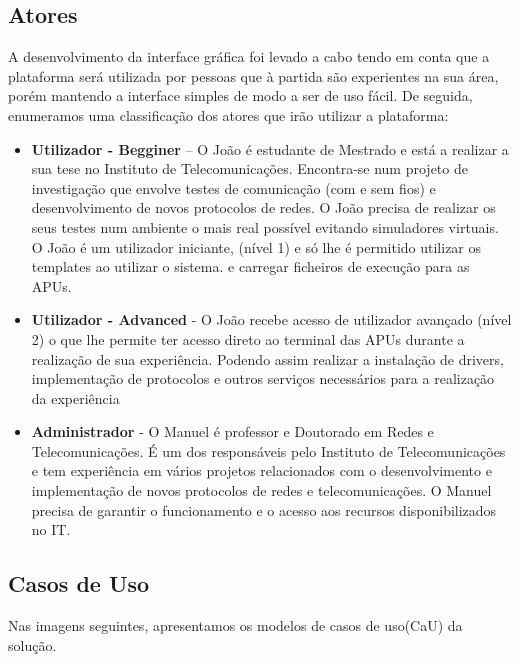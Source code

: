\subsection{Atores}
A desenvolvimento da interface gráfica foi levado a cabo tendo em conta que a plataforma será utilizada por pessoas que à partida são experientes na sua área, porém mantendo a interface simples de modo a ser de uso fácil. De seguida, enumeramos uma classificação dos atores que irão utilizar a plataforma:
\begin{itemize}[noitemsep]
    \item \textbf{Utilizador - Begginer}  – O João é estudante de Mestrado e está a realizar a sua tese no Instituto de Telecomunicações. Encontra-se num projeto de investigação que envolve testes de comunicação (com e sem fios) e desenvolvimento de novos protocolos de redes.\newline 
    O João precisa de realizar os seus testes num ambiente o mais real possível evitando simuladores virtuais. \newline
    O João é um utilizador iniciante, (nível 1) e só lhe é permitido utilizar os templates ao utilizar o sistema. e carregar ficheiros de execução para as APUs.
    \item \textbf{Utilizador - Advanced}  - O João recebe acesso de utilizador avançado (nível 2) o que lhe permite ter acesso direto ao terminal das APUs durante a realização de sua experiência. Podendo assim realizar a instalação de drivers, implementação de protocolos e outros serviços necessários para a realização da experiência
    \item \textbf{Administrador} - O Manuel é professor e Doutorado em Redes e Telecomunicações. É um dos responsáveis pelo Instituto de Telecomunicações e tem experiência em vários projetos relacionados com o desenvolvimento e implementação de novos protocolos de redes e telecomunicações.\newline
    O Manuel precisa de garantir o funcionamento e o acesso aos recursos disponibilizados no IT. 
\end{itemize}

\subsection{Casos de Uso}
Nas imagens seguintes, apresentamos os modelos de casos de uso(CaU) da solução. 
